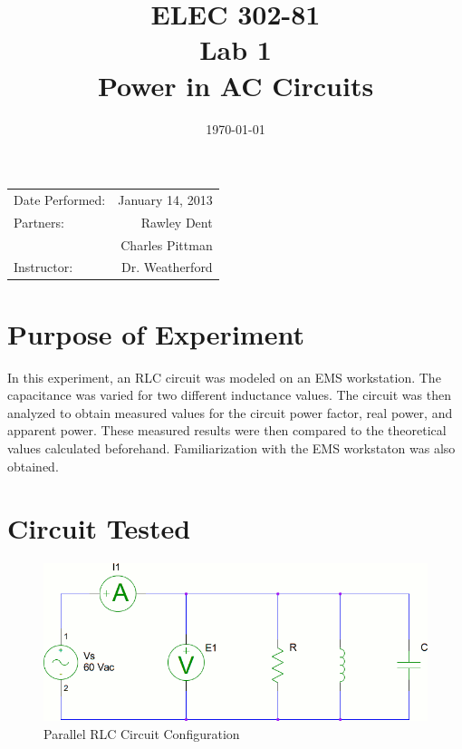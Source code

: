 \documentclass{article}
\title{ELEC 302-81\\ Lab 1\\ Power in AC Circuits} %
\date{\today} %
\begin{document}
\maketitle

\begin{center}
  \begin{tabular}{l r}
    Date Performed: & January 14, 2013 \\
    Partners: & Rawley Dent \\
    & Charles Pittman \\
    Instructor: & Dr. Weatherford
  \end{tabular}
\end{center}

\pagebreak

\setlength\parindent{0pt} %

\section{Purpose of Experiment}
In this experiment, an RLC circuit was modeled on an EMS workstation.
The capacitance was varied for two different inductance values. The circuit
was then analyzed to obtain measured values for the circuit power factor, real
power, and apparent power. These measured results were then compared to the 
theoretical values calculated beforehand. Familiarization with the EMS
workstaton was also obtained.

\section{Circuit Tested}
\begin{figure}[h]
  \begin{center}
    \includegraphics[width=.8\textwidth]{test_circuit}
    \caption{Parallel RLC Circuit Configuration}
    \label{test_circuit}
  \end{center}
\end{figure}
\end{document}
